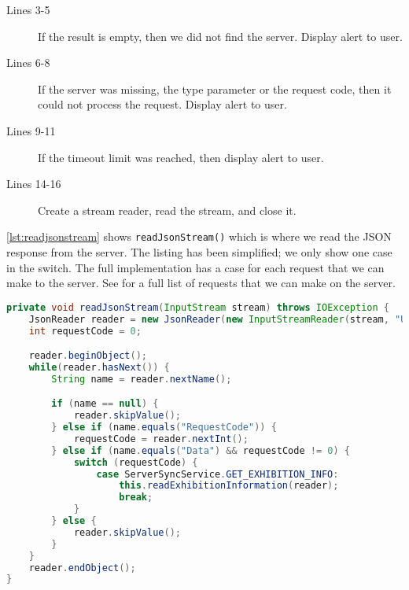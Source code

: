 \begin{description}
\item[Lines 3-5] If the result is empty, then we did not find the server. Display alert to user.
\item[Lines 6-8] If the server was missing, the type parameter or the request code, then it could not process the request. Display alert to user.
\item[Lines 9-11] If the timeout limit was reached, then display alert to user. %
\item[Lines 14-16] Create a stream reader, read the stream, and close it.
\end{description}
\autoref{lst:readjsonstream} shows \lstinline|readJsonStream()| which is where we read the JSON response from the server. The listing has been simplified; we only show one case in the switch. The full implementation has a case for each request that we can make to the server. See  for a full list of requests that we can make on the server.

\begin{lstlisting}[language=java, label=lst:readjsonstream, caption={The method \lstinline|readJsonStream()|}]
private void readJsonStream(InputStream stream) throws IOException {
    JsonReader reader = new JsonReader(new InputStreamReader(stream, "UTF-8"));
    int requestCode = 0;

    reader.beginObject();
    while(reader.hasNext()) {
        String name = reader.nextName();

        if (name == null) {
            reader.skipValue();
        } else if (name.equals("RequestCode")) {
            requestCode = reader.nextInt();
        } else if (name.equals("Data") && requestCode != 0) {
            switch (requestCode) {
                case ServerSyncService.GET_EXHIBITION_INFO:
                    this.readExhibitionInformation(reader);
                    break;
            }
        } else {
            reader.skipValue();
        }
    }
    reader.endObject();
}
\end{lstlisting}

